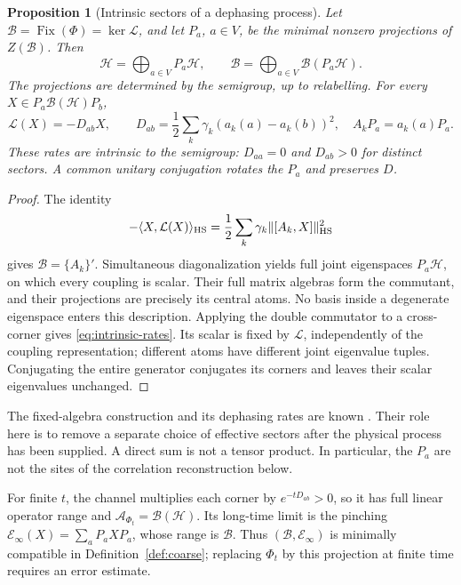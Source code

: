 \documentclass[12pt,a4paper]{article}
\newtheorem{proposition}[theorem]{Proposition}
\begin{document}
\begin{proposition}[Intrinsic sectors of a dephasing process]
\label{prop:intrinsic-sectors}
Let $\mathcal B=\operatorname{Fix}(\Phi)=\ker\mathcal L$, and let
$P_a$, $a\in V$, be the minimal nonzero projections of $Z(\mathcal B)$.
Then
\[
 \mathcal H=\bigoplus_{a\in V}P_a\mathcal H,\qquad
 \mathcal B=\bigoplus_{a\in V}\mathcal B(P_a\mathcal H).
\]
The projections are determined by the semigroup, up to relabelling.
For every $X\in P_a\mathcal B(\mathcal H)P_b$,
\begin{equation}
 \mathcal L(X)=-D_{ab}X,\qquad
 D_{ab}=\frac12\sum_k\gamma_k(a_k(a)-a_k(b))^2,
 \quad A_kP_a=a_k(a)P_a.
 \label{eq:intrinsic-rates}
\end{equation}
These rates are intrinsic to the semigroup: $D_{aa}=0$ and
$D_{ab}>0$ for distinct sectors. A common unitary conjugation rotates
the $P_a$ and preserves $D$.
\end{proposition}

\begin{proof}
The identity
\[
 -\langle X,\mathcal L(X)\rangle_{\rm HS}
 =\frac12\sum_k\gamma_k\|[A_k,X]\|_{\rm HS}^2
\]
gives $\mathcal B=\{A_k\}'$. Simultaneous diagonalization yields full
joint eigenspaces $P_a\mathcal H$, on which every coupling is scalar.
Their full matrix algebras form the commutant, and their projections
are precisely its central atoms. No basis inside a degenerate
eigenspace enters this description. Applying the double commutator
to a cross-corner gives \eqref{eq:intrinsic-rates}. Its scalar is fixed
by $\mathcal L$, independently of the coupling representation;
different atoms have different joint eigenvalue tuples.
Conjugating the entire generator conjugates its corners and leaves
their scalar eigenvalues unchanged.
\end{proof}

The fixed-algebra construction and its dephasing rates are known
\cite{Fagnola2019,Liu2026PaperB}. Their role here is to remove a
separate choice of effective sectors after the physical process has
been supplied. A direct sum is not a tensor product. In particular,
the $P_a$ are not the sites of the correlation reconstruction below.

For finite $t$, the channel multiplies each corner by $e^{-tD_{ab}}>0$,
so it has full linear operator range and
$\mathcal A_{\Phi_t}=\mathcal B(\mathcal H)$. Its long-time limit is
the pinching $\mathcal E_\infty(X)=\sum_aP_aXP_a$, whose range is
$\mathcal B$. Thus $(\mathcal B,\mathcal E_\infty)$ is minimally
compatible in Definition~\ref{def:coarse}; replacing $\Phi_t$ by this
projection at finite time requires an error estimate.
\end{document}
